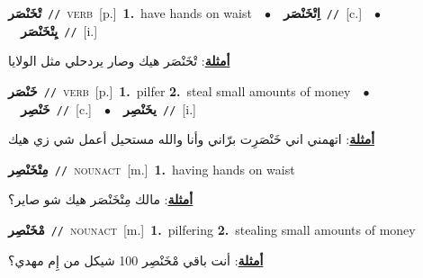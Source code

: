 \documentclass[10pt,a4paper,twoside]{article} %
\begin{document}
\begin{multicols}{2}
{\setlength\topsep{0pt}\textbf{\foreignlanguage{arabic}{تْخَنْصَر}}\ {\color{gray}\texttt{//}\color{black}}\ \textsc{verb}\ [p.]\ \textbf{1.}~have hands on waist\ \ $\bullet$\ \ \setlength\topsep{0pt}\textbf{\foreignlanguage{arabic}{اِتْخَنْصَر}}\ {\color{gray}\texttt{//}\color{black}}\ [c.]\ \ $\bullet$\ \ \setlength\topsep{0pt}\textbf{\foreignlanguage{arabic}{يِتْخَنْصَر}}\ {\color{gray}\texttt{//}\color{black}}\ [i.]\  \begin{flushright}\color{gray}\foreignlanguage{arabic}{\textbf{\underline{\foreignlanguage{arabic}{أمثلة}}}: تْخَنْصَر هيك وصار يردحلي مثل الولايا}\end{flushright}\color{black}} \vspace{2mm}

{\setlength\topsep{0pt}\textbf{\foreignlanguage{arabic}{خَنْصَر}}\ {\color{gray}\texttt{//}\color{black}}\ \textsc{verb}\ [p.]\ \textbf{1.}~pilfer  \textbf{2.}~steal small amounts of money\ \ $\bullet$\ \ \setlength\topsep{0pt}\textbf{\foreignlanguage{arabic}{خَنْصِر}}\ {\color{gray}\texttt{//}\color{black}}\ [c.]\ \ $\bullet$\ \ \setlength\topsep{0pt}\textbf{\foreignlanguage{arabic}{يخَنْصِر}}\ {\color{gray}\texttt{//}\color{black}}\ [i.]\  \begin{flushright}\color{gray}\foreignlanguage{arabic}{\textbf{\underline{\foreignlanguage{arabic}{أمثلة}}}: اتهمني اني خَنْصَرِت برّاني وأنا والله مستحيل أعمل شي زي هيك}\end{flushright}\color{black}} \vspace{2mm}

{\setlength\topsep{0pt}\textbf{\foreignlanguage{arabic}{مِتْخَنْصِر}}\ {\color{gray}\texttt{//}\color{black}}\ \textsc{noun\textunderscore act}\ [m.]\ \textbf{1.}~having hands on waist\  \begin{flushright}\color{gray}\foreignlanguage{arabic}{\textbf{\underline{\foreignlanguage{arabic}{أمثلة}}}: مالك مِتْخَنْصَر هيك شو صاير؟}\end{flushright}\color{black}} \vspace{2mm}

{\setlength\topsep{0pt}\textbf{\foreignlanguage{arabic}{مْخَنْصِر}}\ {\color{gray}\texttt{//}\color{black}}\ \textsc{noun\textunderscore act}\ [m.]\ \textbf{1.}~pilfering  \textbf{2.}~stealing small amounts of money\  \begin{flushright}\color{gray}\foreignlanguage{arabic}{\textbf{\underline{\foreignlanguage{arabic}{أمثلة}}}: أنت باقي مْخَنْصِر 100 شيكل من إِم مهدي؟}\end{flushright}\color{black}} \vspace{2mm}


\end{multicols}
\end{document}

